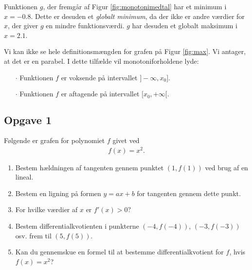\begin{exa}
	Funktionen $g$, der fremgår af Figur \ref{fig:monotonimedtal} har et minimum i $x = -0.8$. Dette er desuden
	et \textit{globalt minimum}, da der ikke er andre værdier for $x$, der giver $g$ en mindre funktionsværdi.
	$g$ har desuden et globalt maksimum i $x = 2.1$. 
\end{exa}
\begin{exa}
	Vi kan ikke se hele definitionsmængden for grafen på Figur \ref{fig:max}. Vi antager, at det er en parabel. I dette tilfælde vil monotoniforholdene lyde:
	\begin{itemize}
		\item[$\cdot$] Funktionen $f$ er voksende på intervallet $]-\infty,x_0]$.
		\item[$\cdot$] Funktionen $f$ er aftagende på intervallet $[x_0,+\infty[$.
	\end{itemize}
\end{exa}
\newpage

\subsection*{Opgave 1}	

Følgende er grafen for polynomiet $f$ givet ved
\begin{align*}
	f(x) = x^2.
\end{align*}
\begin{center}
\end{center}
\begin{enumerate}[label=\roman*)]
	\item Bestem hældningen af tangenten gennem punktet $(1,f(1))$ ved brug af en lineal. 
	\item Bestem en ligning på formen $y = ax + b$ for tangenten gennem dette punkt. 
	\item For hvilke værdier af $x$ er $f'(x) > 0?$ 
	\item Bestem differentialkvotienten i punkterne $(-4,f(-4))$, $(-3,f(-3))$ osv. frem til $(5,f(5))$.
	\item Kan du gennemskue en formel til at bestemme differentialkvotient for $f$, hvis $f(x) = x^2$?
\end{enumerate}

